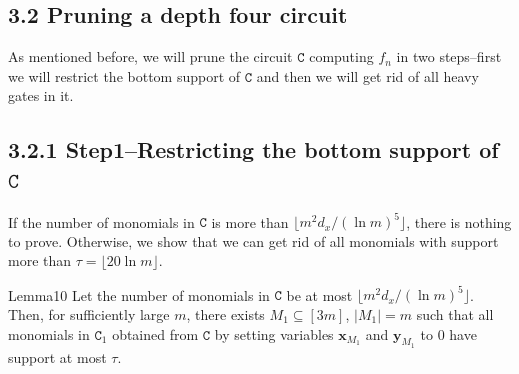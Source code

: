 \subsection*{3.2 Pruning a depth four circuit}
As mentioned before, we will prune the circuit $\mathtt C$ computing $f_n$ in two steps--first we will restrict the bottom support of $\mathtt C$ and then we will get rid of all heavy gates in it.
\subsection*{3.2.1 Step1--Restricting the bottom support of $\mathtt C$}
If the number of monomials in $\mathtt C$ is more than $\lfloor m^2d_x/(\ln m)^5\rfloor$, there is nothing to prove. Otherwise, we show that we can get rid of all monomials with support more than $\tau=\lfloor20\ln m\rfloor$.
\begin{authorclaim}{Lemma10}
Let the number of monomials in $\mathtt C$ be at most $\lfloor m^2d_x/(\ln m)^5\rfloor$. Then, for sufficiently large $m$, there exists $M_1\subseteq[3m]$, $|M_1|=m$ such that all monomials in $\mathtt C_1$ obtained from $\mathtt C$ by setting variables $\mathbf x_{M_1}$ and $\mathbf y_{M_1}$ to 0 have support at most $\tau$.
\end{authorclaim}
